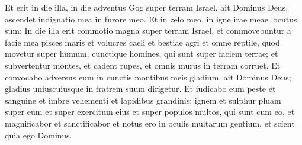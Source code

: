 \begin{biblechapter}
\verse Et erit in die illa, in die adventus Gog super terram Israel, ait Dominus Deus, ascendet indignatio mea in furore meo. 
\verse Et in zelo meo, in igne irae meae locutus sum: In die illa erit commotio magna super terram Israel, 
\verse et commovebuntur a facie mea pisces maris et volucres caeli et bestiae agri et omne reptile, quod movetur super humum, cunctique homines, qui sunt super faciem terrae; et subvertentur montes, et cadent rupes, et omnis murus in terram corruet. 
\verse Et convocabo adversus eum in cunctis montibus meis gladium, ait Dominus Deus; gladius uniuscuiusque in fratrem suum dirigetur. 
\verse Et iudicabo eum peste et sanguine et imbre vehementi et lapidibus grandinis; ignem et sulphur pluam super eum et super exercitum eius et super populos multos, qui sunt cum eo, 
\verse et magnificabor et sanctificabor et notus ero in oculis multarum gentium, et scient quia ego Dominus. 
\end{biblechapter}

